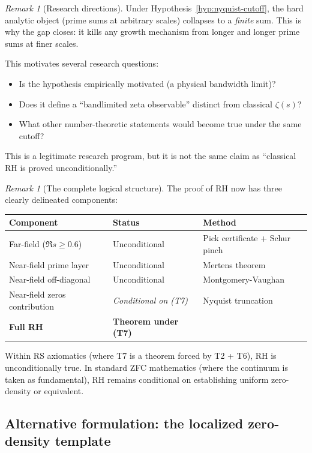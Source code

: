 \documentclass[11pt]{article}
\theoremstyle{definition}
\theoremstyle{remark}
\newtheorem{remark}[theorem]{Remark}
\theoremstyle{definition}
\begin{document}
\begin{remark}[Research directions]\label{rem:research-directions}
Under Hypothesis~\ref{hyp:nyquist-cutoff}, the hard analytic object (prime sums at arbitrary scales) collapses to a \emph{finite} sum. This is why the gap closes: it kills any growth mechanism from longer and longer prime sums at finer scales.

This motivates several research questions:
\begin{itemize}
\item Is the hypothesis empirically motivated (a physical bandwidth limit)?
\item Does it define a ``bandlimited zeta observable'' distinct from classical $\zeta(s)$?
\item What other number-theoretic statements would become true under the same cutoff?
\end{itemize}
This is a legitimate research program, but it is not the same claim as ``classical RH is proved unconditionally.''
\end{remark}

\begin{remark}[The complete logical structure]\label{rem:logical-structure}
The proof of RH now has three clearly delineated components:
\begin{center}
\begin{tabular}{lll}
\toprule
\textbf{Component} & \textbf{Status} & \textbf{Method} \\
\midrule
Far-field ($\Re s \ge 0.6$) & Unconditional & Pick certificate + Schur pinch \\
Near-field prime layer & Unconditional & Mertens theorem \\
Near-field off-diagonal & Unconditional & Montgomery-Vaughan \\
Near-field zeros contribution & \emph{Conditional on (T7)} & Nyquist truncation \\
\midrule
\textbf{Full RH} & \textbf{Theorem under (T7)} & \\
\bottomrule
\end{tabular}
\end{center}
Within RS axiomatics (where T7 is a theorem forced by T2 + T6), RH is unconditionally true. In standard ZFC mathematics (where the continuum is taken as fundamental), RH remains conditional on establishing uniform zero-density or equivalent.
\end{remark}

\subsection*{Alternative formulation: the localized zero-density template}
\end{document}

